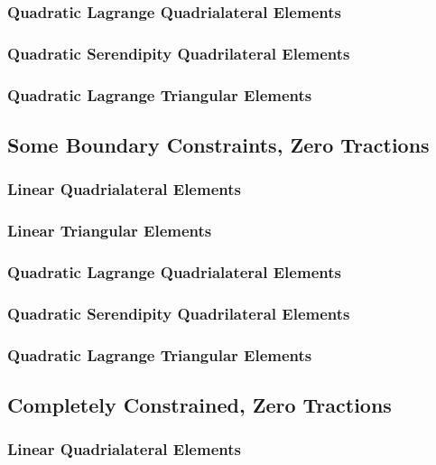 \documentclass{article}
\begin{document}
    \subsubsection{Quadratic Lagrange Quadrialateral Elements}

    \subsubsection{Quadratic Serendipity Quadrilateral Elements}

    \subsubsection{Quadratic Lagrange Triangular Elements}

\subsection{Some Boundary Constraints, Zero Tractions}
    \subsubsection{Linear Quadrialateral Elements}

    \subsubsection{Linear Triangular Elements}

    \subsubsection{Quadratic Lagrange Quadrialateral Elements}

    \subsubsection{Quadratic Serendipity Quadrilateral Elements}

    \subsubsection{Quadratic Lagrange Triangular Elements}

\subsection{Completely Constrained, Zero Tractions}
    \subsubsection{Linear Quadrialateral Elements}
\end{document}
